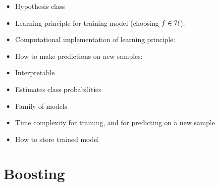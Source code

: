 \begin{itemize}
  \item Hypothesis class 
       \item Learning principle for training model (choosing $f\in\mathcal{H}$):
	     \item Computational implementation of learning principle:
  \item How to make predictions on new samples:  
  \item Interpretable
    \item Estimates class probabilities 
    \item Family of models
       \item Time complexity for training, and for predicting on a new sample
  \item How to store trained model
\end{itemize}

\section{Boosting}

